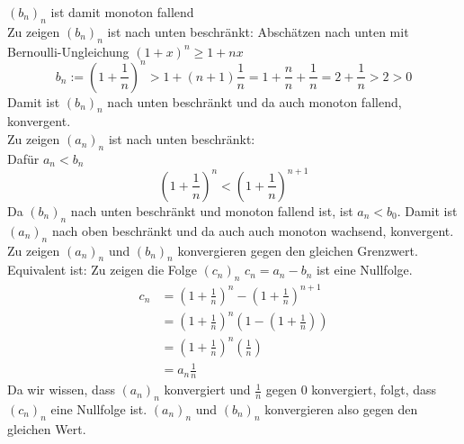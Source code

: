 \documentclass{article}
\begin{document}
    \( {(b_n)}_n \) ist damit monoton fallend \\

    Zu zeigen \({(b_n)}_n\) ist nach unten beschränkt:
    Abschätzen nach unten mit Bernoulli-Ungleichung \({(1+x)}^n \geq 1 + nx\)
    \[ 
        b_n := { \left( 1 + \frac{1}{n} \right) }^n >
        1 + (n+1) \frac{1}{n} = 
        1 + \frac{n}{n} + \frac{1}{n} =
        2 + \frac{1}{n} > 2 > 0
    \]
    Damit ist \({(b_n)}_n\) nach unten beschränkt und da auch monoton fallend, konvergent. \\
    
    Zu zeigen \({(a_n)}_n\) ist nach unten beschränkt: \\
    Dafür \(a_n < b_n\)
    \[ { \left( 1 + \frac{1}{n} \right) }^n < { \left( 1 + \frac{1}{n} \right) }^{n+1} \]
    Da \({(b_n)}_n\) nach unten beschränkt und monoton fallend ist, ist \(a_n < b_0\).
    Damit ist \({(a_n)}_n\) nach oben beschränkt und da auch auch monoton wachsend, konvergent. \\

    Zu zeigen \({(a_n)}_n\) und \({(b_n)}_n\) konvergieren gegen den gleichen Grenzwert. \\
    Equivalent ist: Zu zeigen die Folge \({(c_n)}_n\) \(c_n = a_n - b_n\) ist eine Nullfolge.
    \begin{align*}
        c_n &= { \left( 1 + \frac{1}{n} \right) }^n - { \left( 1 + \frac{1}{n} \right) }^{n+1} \\
        &= { \left( 1 + \frac{1}{n} \right) }^n \left( 1 - \left( 1 + \frac{1}{n} \right) \right) \\
        &= { \left( 1 + \frac{1}{n} \right) }^n \left( \frac{1}{n} \right) \\
        &= a_n \frac{1}{n}
    \end{align*}
    Da wir wissen, dass \({(a_n)}_n\) konvergiert und \(\frac{1}{n}\) gegen 0 konvergiert, folgt, dass \({(c_n)_n}\)
    eine Nullfolge ist. \({(a_n)}_n\) und \({(b_n)}_n\) konvergieren also gegen den gleichen Wert.
    
\end{document}
